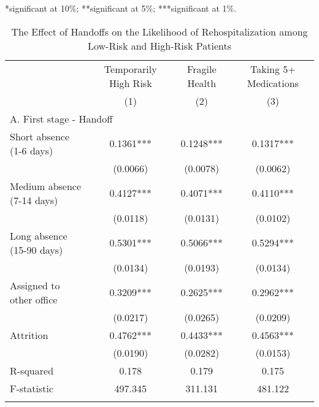 \documentclass[final,12pt, notitlepage]{article}
\begin{document}
\begin{singlespace}
\begin{table}[H]
\begin{threeparttable}
\begin{tablenotes}
	*significant at 10\%; **significant at 5\%; ***significant at 1\%.
	\end{tablenotes}
\end{threeparttable}
\end{table}



\begin{table}[H]
\footnotesize
\setlength\tabcolsep{0pt}
\centering
\caption{The Effect of Handoffs on the Likelihood of Rehospitalization among Low-Risk and High-Risk Patients}
\label{tab:iv_byseverity}
\begin{threeparttable}
{
\def\sym#1{\ifmmode^{#1}\else\(^{#1}\)\fi}
\begin{tabular*}{\textwidth}{l@{\extracolsep{\fill}}*{3}{c}} %
\toprule
& {Temporarily High Risk} & {Fragile Health} & {Taking 5+ Medications}\\
                    &\multicolumn{1}{c}{(1)}&\multicolumn{1}{c}{(2)}&\multicolumn{1}{c}{(3)}\\
\midrule
\multicolumn{4}{l}{A. First stage - Handoff} \\
Short absence (1-6 days) &      0.1361*** &      0.1248*** &      0.1317***\\
                    &    (0.0066)      &    (0.0078)      &    (0.0062)   \\
Medium absence (7-14 days)&      0.4127*** &      0.4071*** &      0.4110***\\
                     &    (0.0118)       &    (0.0131)    &    (0.0102)   \\
Long absence (15-90 days)&      0.5301*** &      0.5066*** &      0.5294***\\
                   &    (0.0134)      &    (0.0193)     &    (0.0134)   \\
Assigned to other office&      0.3209*** &      0.2625*** &      0.2962***\\
                  &    (0.0217)       &    (0.0265)    &    (0.0209)   \\
Attrition       &      0.4762***  &      0.4433***  &      0.4563***\\
                 &    (0.0190)        &    (0.0282)     &    (0.0153)   \\
R-squared        &       0.178       &       0.179    &       0.175   \\
F-statistic       &     497.345     &     311.131     &     481.122   \\
\\

\end{tabular*}}
\end{threeparttable}
\end{table}
\end{singlespace}
\end{document}
